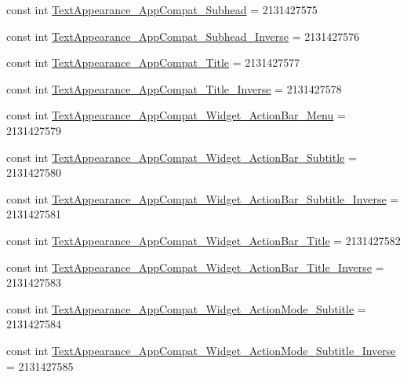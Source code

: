 \begin{DoxyCompactItemize}
\item 
const int \mbox{\hyperlink{class_f_w_p_s___app_1_1_droid_1_1_resource_1_1_style_a9e689cf25710b0b8426f73d5e79b693a}{Text\+Appearance\+\_\+\+App\+Compat\+\_\+\+Subhead}} = 2131427575
\item 
const int \mbox{\hyperlink{class_f_w_p_s___app_1_1_droid_1_1_resource_1_1_style_a84f8adc81993567e945646860dcfb26b}{Text\+Appearance\+\_\+\+App\+Compat\+\_\+\+Subhead\+\_\+\+Inverse}} = 2131427576
\item 
const int \mbox{\hyperlink{class_f_w_p_s___app_1_1_droid_1_1_resource_1_1_style_a02940f6a98d182303db80e9093c78cb9}{Text\+Appearance\+\_\+\+App\+Compat\+\_\+\+Title}} = 2131427577
\item 
const int \mbox{\hyperlink{class_f_w_p_s___app_1_1_droid_1_1_resource_1_1_style_ae2242eb79af9df139ae03fbfecceac65}{Text\+Appearance\+\_\+\+App\+Compat\+\_\+\+Title\+\_\+\+Inverse}} = 2131427578
\item 
const int \mbox{\hyperlink{class_f_w_p_s___app_1_1_droid_1_1_resource_1_1_style_a2e26e4aeff05cf849dbce8eb668e8c37}{Text\+Appearance\+\_\+\+App\+Compat\+\_\+\+Widget\+\_\+\+Action\+Bar\+\_\+\+Menu}} = 2131427579
\item 
const int \mbox{\hyperlink{class_f_w_p_s___app_1_1_droid_1_1_resource_1_1_style_a34f11910ba79f0f761fc1287f0d4bdf9}{Text\+Appearance\+\_\+\+App\+Compat\+\_\+\+Widget\+\_\+\+Action\+Bar\+\_\+\+Subtitle}} = 2131427580
\item 
const int \mbox{\hyperlink{class_f_w_p_s___app_1_1_droid_1_1_resource_1_1_style_a12ea25274c88371b0c7ad819550790aa}{Text\+Appearance\+\_\+\+App\+Compat\+\_\+\+Widget\+\_\+\+Action\+Bar\+\_\+\+Subtitle\+\_\+\+Inverse}} = 2131427581
\item 
const int \mbox{\hyperlink{class_f_w_p_s___app_1_1_droid_1_1_resource_1_1_style_a0a5c4ee7112be01f0a2e22c3c9113c32}{Text\+Appearance\+\_\+\+App\+Compat\+\_\+\+Widget\+\_\+\+Action\+Bar\+\_\+\+Title}} = 2131427582
\item 
const int \mbox{\hyperlink{class_f_w_p_s___app_1_1_droid_1_1_resource_1_1_style_a43814e55593f50452b301d9e987fb0fe}{Text\+Appearance\+\_\+\+App\+Compat\+\_\+\+Widget\+\_\+\+Action\+Bar\+\_\+\+Title\+\_\+\+Inverse}} = 2131427583
\item 
const int \mbox{\hyperlink{class_f_w_p_s___app_1_1_droid_1_1_resource_1_1_style_ad821fd349fdfc4617d4937d7e547a0dc}{Text\+Appearance\+\_\+\+App\+Compat\+\_\+\+Widget\+\_\+\+Action\+Mode\+\_\+\+Subtitle}} = 2131427584
\item 
const int \mbox{\hyperlink{class_f_w_p_s___app_1_1_droid_1_1_resource_1_1_style_a553d9b355142bacc06fc17fedbbb4b07}{Text\+Appearance\+\_\+\+App\+Compat\+\_\+\+Widget\+\_\+\+Action\+Mode\+\_\+\+Subtitle\+\_\+\+Inverse}} = 2131427585

\end{DoxyCompactItemize}
